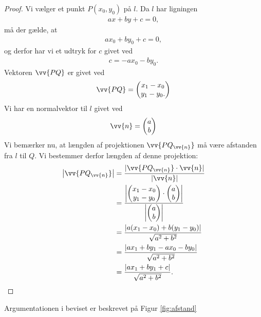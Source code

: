 \begin{proof}
Vi vælger et punkt  $P(x_0,y_0)$ på $l$. Da $l$ har ligningen
\begin{align*}
ax+by+c = 0, 
\end{align*}
må der gælde, at 
\begin{align*}
ax_0+by_0+c = 0, 
\end{align*}
og derfor har vi et udtryk for $c$ givet ved
\begin{align*}
c = -ax_0-by_0.
\end{align*}
Vektoren $\vv{PQ}$ er givet ved
\begin{align*}
\vv{PQ} = \begin{pmatrix}
x_1 - x_0 \\ y_1 - y_0.
\end{pmatrix}
\end{align*}
Vi har en normalvektor til $l$ givet ved 
\begin{align*}
\vv{n}=
\begin{pmatrix}
a \\ b
\end{pmatrix}
\end{align*}
Vi bemærker nu, at længden af projektionen $\vv{PQ_{\vv{n}}}$ må være afstanden fra $l$ til $Q$. Vi bestemmer derfor længden af denne projektion:
\begin{align*}
\left|\vv{PQ_{\vv{n}}}\right| &= \frac{|\vv{PQ_{\vv{n}}}\cdot \vv{n}|}{|\vv{n}|} \\ 
&= \frac{\left|\begin{pmatrix}
x_1-x_0 \\ y_1 - y_0
\end{pmatrix}\cdot \begin{pmatrix}
a \\ b
\end{pmatrix} \right|}{\left|\begin{pmatrix}
a \\ b
\end{pmatrix}\right|}\\
&=\frac{|a(x_1-x_0)+b(y_1-y_0)|}{\sqrt{a^2+b^2}}\\
&= \frac{|ax_1+by_1 -ax_0-by_0|}{\sqrt{a^2+b^2}}\\
&= \frac{|ax_1+by_1+c|}{\sqrt{a^2+b^2}}.
\end{align*}
\end{proof}
Argumentationen i beviset er beskrevet på Figur \ref{fig:afstand}
